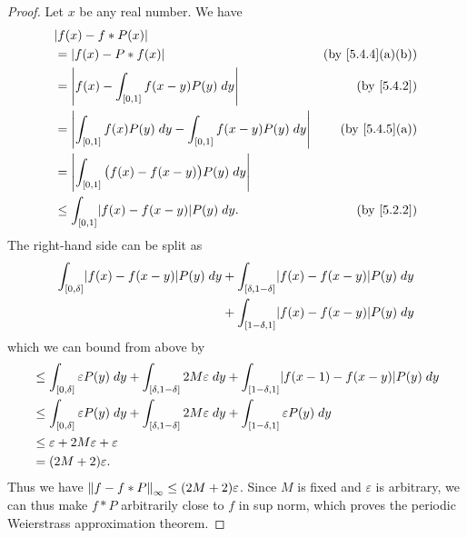 \begin{proof}
  Let \(x\) be any real number.
  We have
  \begin{align*}
     & \abs{f(x) - f * P(x)}                                                                                      \\
     & = \abs{f(x) - P * f(x)}                                                   & \text{(by \cref{5.4.4}(a)(b))} \\
     & = \abs{f(x) - \int_{[0, 1]} f(x - y) P(y) \; dy}                          & \text{(by \cref{5.4.2})}       \\
     & = \abs{\int_{[0, 1]} f(x) P(y) \; dy - \int_{[0, 1]} f(x - y) P(y) \; dy} & \text{(by \cref{5.4.5}(a))}    \\
     & = \abs{\int_{[0, 1]} \big(f(x) - f(x - y)\big) P(y) \; dy}                                                 \\
     & \leq \int_{[0, 1]} \abs{f(x) - f(x - y)} P(y) \; dy.                      & \text{(by \cref{5.2.2})}
  \end{align*}
  The right-hand side can be split as
  \begin{align*}
    \int_{[0, \delta]} \abs{f(x) - f(x - y)} P(y) \; dy & + \int_{[\delta, 1 - \delta]} \abs{f(x) - f(x - y)} P(y) \; dy \\
                                                        & + \int_{[1 - \delta, 1]} \abs{f(x) - f(x - y)} P(y) \; dy
  \end{align*}
  which we can bound from above by
  \begin{align*}
     & \leq \int_{[0, \delta]} \varepsilon P(y) \; dy + \int_{[\delta, 1 - \delta]} 2 M \varepsilon \; dy + \int_{[1 - \delta, 1]} \abs{f(x - 1) - f(x - y)} P(y) \; dy \\
     & \leq \int_{[0, \delta]} \varepsilon P(y) \; dy + \int_{[\delta, 1 - \delta]} 2 M \varepsilon \; dy + \int_{[1 - \delta, 1]} \varepsilon P(y) \; dy               \\
     & \leq \varepsilon + 2 M \varepsilon + \varepsilon                                                                                                                 \\
     & = (2M + 2) \varepsilon.
  \end{align*}
  Thus we have \(\norm*{f - f * P}_{\infty} \leq (2M + 2) \varepsilon\).
  Since \(M\) is fixed and \(\varepsilon\) is arbitrary, we can thus make \(f * P\) arbitrarily close to \(f\) in sup norm, which proves the periodic Weierstrass approximation theorem.
\end{proof}

